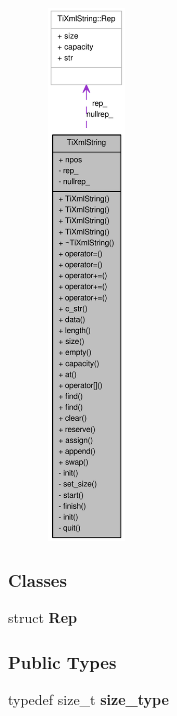 \begin{figure}[H]
\begin{center}
\leavevmode
\includegraphics[height=400pt]{class_ti_xml_string__coll__graph}
\end{center}
\end{figure}
\subsubsection*{Classes}
\begin{DoxyCompactItemize}
\item 
struct {\bfseries Rep}
\end{DoxyCompactItemize}
\subsubsection*{Public Types}
\begin{DoxyCompactItemize}
\item 
\hypertarget{class_ti_xml_string_abeb2c1893a04c17904f7c06546d0b971}{
typedef size\_\-t {\bfseries size\_\-type}}
\label{class_ti_xml_string_abeb2c1893a04c17904f7c06546d0b971}

\end{DoxyCompactItemize}
